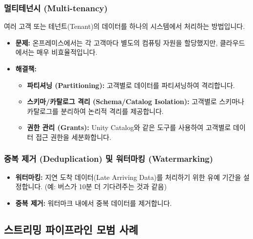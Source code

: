 \documentclass[11pt,a4paper]{article}
\begin{document}
\subsubsection{멀티테넌시 (Multi-tenancy)}
여러 고객 또는 테넌트(Tenant)의 데이터를 하나의 시스템에서 처리하는 방법입니다.
\begin{itemize}
    \item \textbf{문제:} 온프레미스에서는 각 고객마다 별도의 컴퓨팅 자원을 할당했지만, 클라우드에서는 매우 비효율적입니다.
    \item \textbf{해결책:}
    \begin{itemize}
        \item \textbf{파티셔닝 (Partitioning):} 고객별로 데이터를 파티셔닝하여 격리합니다.
        \item \textbf{스키마/카탈로그 격리 (Schema/Catalog Isolation):} 고객별로 스키마나 카탈로그를 분리하여 논리적 격리를 제공합니다.
        \item \textbf{권한 관리 (Grants):} Unity Catalog와 같은 도구를 사용하여 고객별로 데이터 접근 권한을 세분화합니다.
    \end{itemize}
\end{itemize}

\subsubsection{중복 제거 (Deduplication) 및 워터마킹 (Watermarking)}
\begin{itemize}
    \item \textbf{워터마킹:} 지연 도착 데이터(Late Arriving Data)를 처리하기 위한 유예 기간을 설정합니다. (예: 버스가 10분 더 기다려주는 것과 같음)
    \item \textbf{중복 제거:} 워터마크 내에서 중복 데이터를 제거합니다.
\end{itemize}

\subsection{스트리밍 파이프라인 모범 사례}
\end{document}
